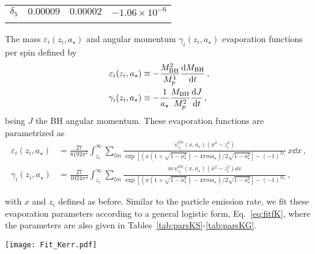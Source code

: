 \documentclass[aps,prd,reprint,twocolumn,preprintnumbers,floatfix,nofootinbib]{revtex4-1}
\newcommand{\MBH}{M_{\rm BH}}
\newcommand{\MPL}{M_p}
\newcommand{\as}{a_\star}
\begin{document}
\begin{widetext}
\begin{table*}
{\begin{tabular}{c|r|r|r}
        $\delta_5$ & $0.00009$ & $0.00002$ & $-1.06\times 10^{-6}$ \\ 
        \botrule
    \end{tabular}
}
\caption{Fitting parameters of our parametrized from Eqs.~\eqref{eq:fitfK}, \eqref{eq:ABCn-Kerr} for spin-2 particles.}
\label{tab:parsKG}
\end{table*}
The mass $\varepsilon_i(z_i,\as)$ and angular momentum $\gamma_i(z_i,\as)$ evaporation functions per spin defined by
\begin{subequations}
\begin{align}
    \varepsilon_i(z_i,\as)&\equiv-\frac{\MBH^2}{\MPL^4}\frac{\dd{\MBH}}{\dd{t}}\,,\\ 
    \gamma_i(z_i,\as)&\equiv-\frac{1}{\as}\frac{\MBH}{\MPL^2}\frac{\dd{J}}{\dd{t}}\,,
\end{align}
\end{subequations}
being $J$ the BH angular momentum. These evaporation functions are parametrized as
\begin{subequations}
\begin{align}
   \varepsilon_i(z_i,\as) &= \frac{27}{8192\pi^5}\int_{z_i}^\infty\sum_{lm}\frac{\psi_{s_i}^{lm}(x,\as)(x^2-z_i^2)}{\exp[(x(1+\sqrt{1-\as^2})-4\pi m\as)/2\sqrt{1-\as^2}]-(-1)^{2s_i}}\,x\dd{x}\,,\\
   \gamma_i(z_i,\as) &= \frac{27}{1024\pi^4}\int_{z_i}^\infty\sum_{lm}\frac{m\,\psi_{s_i}^{lm}(x,\as)(x^2-z_i^2)\dd{x}}{\exp[(x(1+\sqrt{1-\as^2})-4\pi m\as)/2\sqrt{1-\as^2}]-(-1)^{2s_i}}\,,
\end{align}
\end{subequations}
\end{widetext}
with $x$ and $z_i$ defined as before. Similar to the particle emission rate, we fit these evaporation parameters according to a general logistic form, Eq.~\eqref{eq:fitfK}, where the parameters are also given in Tables~\ref{tab:parsKS}-\ref{tab:parsKG}.
\begin{figure*}[t!]
 \texttt{[image: Fit\_Kerr.pdf]}
 \caption{Total emission rate as function of $GM\mu_i$ for the different types of particles, scalars, fermions, vectors and spin-2 for a Kerr BH with $a_\star=0.99$. The red points correspond to the values obtained directly by integration of Eqs.~\eqref{eq:GamKBHA} and \eqref{eq:GamKBHB}, while the blue lines are our fitted forms. \label{fig:fitK}}
\end{figure*}
\end{document}

